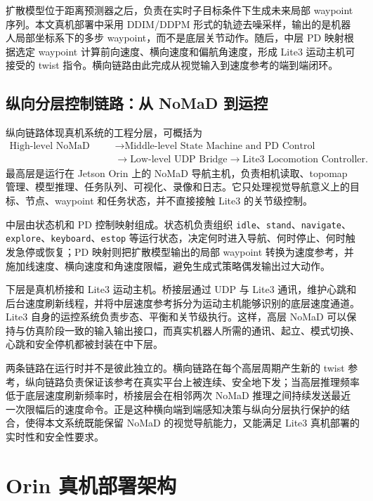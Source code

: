 扩散模型位于距离预测器之后，负责在实时子目标条件下生成未来局部 waypoint 序列。本文真机部署中采用 DDIM/DDPM 形式的轨迹去噪采样，输出的是机器人局部坐标系下的多步 waypoint，而不是底层关节动作。随后，中层 PD 映射根据选定 waypoint 计算前向速度、横向速度和偏航角速度，形成 Lite3 运动主机可接受的 twist 指令。横向链路由此完成从视觉输入到速度参考的端到端闭环。

\subsection{纵向分层控制链路：从 NoMaD 到运控}

纵向链路体现真机系统的工程分层，可概括为
\begin{equation}
\begin{aligned}
\text{High-level NoMaD Host}
&\rightarrow \text{Middle-level State Machine and PD Control} \\
&\rightarrow \text{Low-level UDP Bridge}
\rightarrow \text{Lite3 Locomotion Controller}.
\end{aligned}
\end{equation}
最高层是运行在 Jetson Orin 上的 NoMaD 导航主机，负责相机读取、topomap 管理、模型推理、任务队列、可视化、录像和日志。它只处理视觉导航意义上的目标、节点、waypoint 和任务状态，并不直接接触 Lite3 的关节级控制。

中层由状态机和 PD 控制映射组成。状态机负责组织 \texttt{idle}、\texttt{stand}、\texttt{navigate}、\texttt{explore}、\texttt{keyboard}、\texttt{estop} 等运行状态，决定何时进入导航、何时停止、何时触发急停或恢复；PD 映射则把扩散模型输出的局部 waypoint 转换为速度参考，并施加线速度、横向速度和角速度限幅，避免生成式策略偶发输出过大动作。

下层是真机桥接和 Lite3 运动主机。桥接层通过 UDP 与 Lite3 通讯，维护心跳和后台速度刷新线程，并将中层速度参考拆分为运动主机能够识别的底层速度通道。Lite3 自身的运控系统负责步态、平衡和关节级执行。这样，高层 NoMaD 可以保持与仿真阶段一致的输入输出接口，而真实机器人所需的通讯、起立、模式切换、心跳和安全停机都被封装在中下层。

两条链路在运行时并不是彼此独立的。横向链路在每个高层周期产生新的 twist 参考，纵向链路负责保证该参考在真实平台上被连续、安全地下发；当高层推理频率低于底层速度刷新频率时，桥接层会在相邻两次 NoMaD 推理之间持续发送最近一次限幅后的速度命令。正是这种横向端到端感知决策与纵向分层执行保护的结合，使得本文系统既能保留 NoMaD 的视觉导航能力，又能满足 Lite3 真机部署的实时性和安全性要求。

\section{Orin 真机部署架构}

